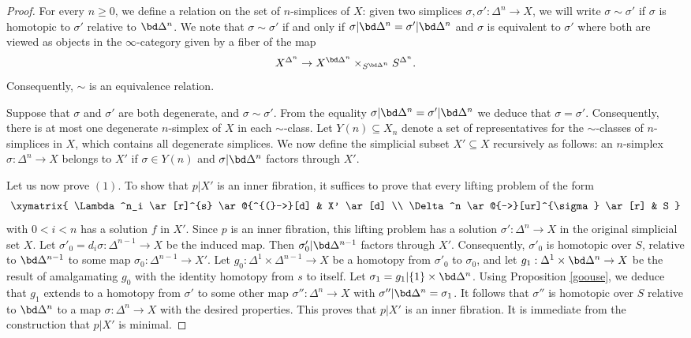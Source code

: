 \begin{proof}
For every $n \geq 0$, we define a relation on the set of $n$-simplices
of $X$: given two simplices $\sigma, \sigma': \Delta^n \rightarrow X$, we will write
$\sigma \sim \sigma'$ if $\sigma$ is homotopic to $\sigma'$ relative to $\bd \Delta^n$. We note that $\sigma \sim \sigma'$ if and only if $\sigma| \bd \Delta^n = \sigma'| \bd \Delta^n$ and
$\sigma$ is equivalent to $\sigma'$ where both are viewed as objects in the $\infty$-category given by a fiber of the map
$$ X^{\Delta^n} \rightarrow X^{ \bd \Delta^n} \times_{ S^{\bd \Delta^n} } S^{\Delta^n}.$$
Consequently, $\sim$ is an equivalence relation.

Suppose that $\sigma$ and $\sigma'$ are both degenerate, and $\sigma \sim \sigma'$.
From the equality $\sigma | \bd \Delta^n = \sigma' | \bd \Delta^n$ we deduce that $\sigma = \sigma'$. Consequently, there is at most one degenerate $n$-simplex of $X$ in each $\sim$-class. Let $Y(n) \subseteq X_n$ denote a set of representatives for the $\sim$-classes of $n$-simplices in $X$, which contains all degenerate simplices. We now define the simplicial subset
$X' \subseteq X$ recursively as follows: an $n$-simplex $\sigma: \Delta^n \rightarrow X$
belongs to $X'$ if $\sigma \in Y(n)$ and $\sigma| \bd \Delta^n$ factors through $X'$.

Let us now prove $(1)$. To show that $p|X'$ is an inner fibration, it suffices to prove that
every lifting problem of the form
$$ \xymatrix{ \Lambda^n_i \ar[r]^{s} \ar@{^{(}->}[d] & X' \ar[d] \\
\Delta^n \ar@{-->}[ur]^{\sigma} \ar[r] & S }$$
with $0 < i < n$ has a solution $f$ in $X'$. Since $p$ is an inner fibration, this lifting problem
has a solution $\sigma': \Delta^n \rightarrow X$ in the original simplicial set $X$. Let
$\sigma'_0 = d_i \sigma: \Delta^{n-1} \rightarrow X$ be the induced map.
Then $\sigma'_0 | \bd \Delta^{n-1}$ factors through $X'$. Consequently, $\sigma'_0$
is homotopic over $S$, relative to $\bd \Delta^{n-1}$ to some map
$\sigma_0: \Delta^{n-1} \rightarrow X'$. Let $g_0: \Delta^1 \times \Delta^{n-1} \rightarrow X$
be a homotopy from $\sigma'_0$ to $\sigma_0$, and let 
$g_1: \Delta^1 \times \bd \Delta^n \rightarrow X$ be the result of amalgamating
$g_0$ with the identity homotopy from $s$ to itself. Let $\sigma_1 = g_1| \{1\} \times \bd \Delta^n$.
Using Proposition \ref{goouse}, we deduce that $g_1$ extends to a homotopy from
$\sigma'$ to some other map $\sigma'': \Delta^{n} \rightarrow X$ with
$\sigma''| \bd \Delta^{n} = \sigma_1$. It follows that $\sigma''$ is homotopic
over $S$ relative to $\bd \Delta^n$ to a map $\sigma: \Delta^n \rightarrow X$ with the desired properties. This proves that $p|X'$ is an inner fibration. It is immediate from the construction that $p|X'$ is minimal.


\end{proof}

